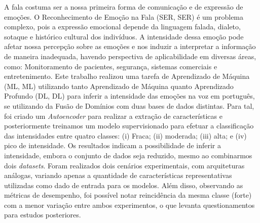 A fala costuma ser a nossa primeira forma de comunicação e de expressão de emoções. O Reconhecimento de Emoção na Fala (\acrlong{SER}, \acrshort{SER}) é um problema complexo, pois a expressão emocional depende da linguagem falada, dialeto, sotaque e histórico cultural dos indivíduos. A intensidade dessa emoção pode afetar nossa percepção sobre as emoções e nos induzir a interpretar a informação de maneira inadequada, havendo perspectiva de aplicabilidade em diversas áreas, como: Monitoramento de pacientes, segurança, sistemas comerciais e entretenimento. Este trabalho realizou uma tarefa de Aprendizado de Máquina (\acrlong{ML}, \acrshort{ML}) utilizando tanto Aprendizado de Máquina quanto Aprendizado Profundo (\acrlong{DL}, \acrshort{DL}) para inferir a intensidade das emoções na voz em português, se utilizando da Fusão de Domínios com duas bases de dados distintas. Para tal, foi criado um \textit{Autoencoder} para realizar a extração de características e posteriormente treinamos um modelo supervisionado para efetuar a classificação das intensidades entre quatro classes: (i) Fraca; (ii) moderada; (iii) alta; e (iv) pico de intensidade. Os resultados indicam a possibilidade de inferir a intensidade, embora o conjunto de dados seja reduzido, mesmo ao combinarmos dois \textit{datasets}. Foram realizados dois cenários experimentais, com arquiteturas análogas, variando apenas a quantidade de características representativas utilizadas como dado de entrada para os modelos. Além disso, observando as métricas de desempenho, foi possível notar reincidência da mesma classe (forte) com a menor variação entre ambos experimentos, o que levanta questionamentos para estudos posteriores.
